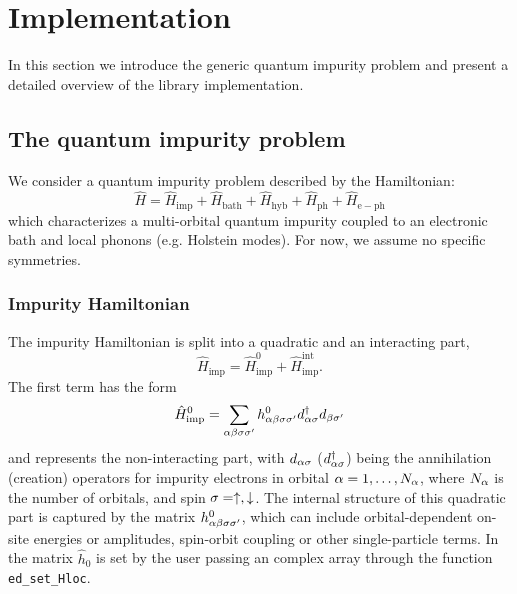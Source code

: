 \documentclass[edipack_sp.tex]{subfiles}
\begin{document}
\section{Implementation}\label{SecEDIpack}
In this section we introduce the generic quantum impurity problem and
present a detailed overview of the \NAME library implementation. 




\subsection{The quantum impurity problem}\label{sSecQIM}
We consider a quantum impurity problem described by the Hamiltonian:
$$
\hat{H} = \hat{H}_\mathrm{imp} + \hat{H}_\mathrm{bath} + \hat{H}_\mathrm{hyb} + \hat{H}_\mathrm{ph} + \hat{H}_\mathrm{e-ph}
$$
which characterizes a multi-orbital quantum impurity
coupled to an electronic bath and local phonons (e.g. Holstein
modes). For now, we assume no specific symmetries.

\subsubsection{Impurity Hamiltonian}
The impurity Hamiltonian is split into a quadratic and an 
interacting part,
\begin{equation}\label{Himp}
  \hat{H}_\mathrm{imp}  = \hat{H}^0_\mathrm{imp} + \hat{H}^\mathrm{int}_\mathrm{imp}.
\end{equation}
The first term has the form
\begin{equation}\label{H0imp}
  \hat{H}^0_\mathrm{imp}  =
  \sum_{\alpha\beta\sigma\sigma'}h^{0}_{\alpha\beta\sigma\sigma'}d^\dagger_{\alpha\sigma}d_{\beta\sigma'}
\end{equation}
and represents the non-interacting part, with $d_{\alpha\sigma}$ ($d^\dagger_{\alpha\sigma}$) being the annihilation (creation)
operators for impurity electrons in 
orbital $\alpha=1,\dots,N_\alpha$, where $N_\alpha$ is the number of orbitals,
and spin $\sigma=\uparrow,\downarrow$.
The internal structure of this quadratic part is captured by the 
matrix $h^{0}_{\alpha\beta\sigma\sigma'}$, which can include 
orbital-dependent on-site energies or amplitudes, spin-orbit coupling or other single-particle terms.
In \NAME the matrix $\hat{h}_0$ is set by the user passing an complex array through the function {\tt ed\_set\_Hloc}. 
\end{document}
